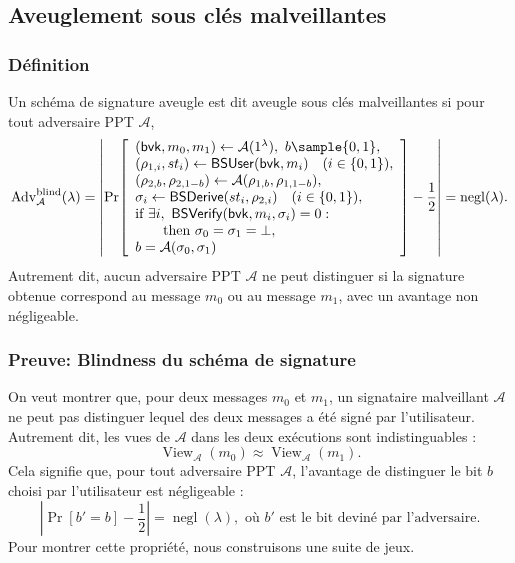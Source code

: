 
\subsection{Aveuglement sous clés malveillantes}

\subsubsection{Définition}

\begin{definition}[Blindness]
Un schéma de signature aveugle est dit aveugle sous clés malveillantes si pour tout adversaire PPT
$\mathcal A$,
\[
\operatorname{Adv}^{\mathrm{blind}}_{\mathcal A}(\lambda)
=
\left|
\Pr\!\left[
\begin{array}{l}
(\mathsf{bvk},m_0,m_1)\gets\mathcal A(1^\lambda),\
b\sample\{0,1\},\\
(\rho_{1,i},st_i)\gets\mathsf{BSUser}(\mathsf{bvk},m_i)
\quad(i\in\{0,1\}),\\
(\rho_{2,b},\rho_{2,1-b})\gets
\mathcal A(\rho_{1,b},\rho_{1,1-b}),\\
\sigma_i\gets
\mathsf{BSDerive}(st_i,\rho_{2,i})
\quad(i\in\{0,1\}),\\
\text{if }\exists i,\
\mathsf{BSVerify}(\mathsf{bvk},m_i,\sigma_i)=0:\\
\qquad\text{then }\sigma_0=\sigma_1=\bot,\\
b=\mathcal A(\sigma_0,\sigma_1)
\end{array}
\right]
-\frac12
\right|
= \operatorname{negl}(\lambda).
\]
Autrement dit, aucun adversaire PPT $\mathcal A$ ne peut distinguer si la signature obtenue correspond au message $m_0$ ou au message $m_1$, avec un avantage non négligeable.
\end{definition}

\subsubsection{Preuve: Blindness du schéma de signature}
On veut montrer que, pour deux messages $m_0$ et $m_1$, un signataire malveillant $\mathcal{A}$ ne peut pas distinguer lequel des deux messages a été signé par l'utilisateur. Autrement dit, les vues de $\mathcal{A}$ dans les deux exécutions sont indistinguables :
\[
\operatorname{View}_{\mathcal{A}}(m_0) \approx \operatorname{View}_{\mathcal{A}}(m_1).
\]
Cela signifie que, pour tout adversaire PPT $\mathcal{A}$, l'avantage de distinguer le bit $b$ choisi par l'utilisateur est négligeable :
\[
\left|\Pr[b'=b]-\frac{1}{2}\right|=\operatorname{negl}(\lambda), \text{ où $b'$ est le bit deviné par l'adversaire.}
\]
Pour montrer cette propriété, nous construisons une suite de jeux.

